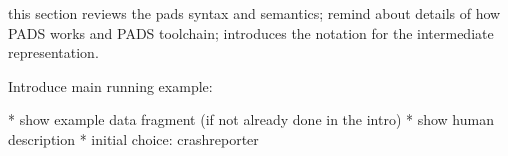 this section reviews the pads syntax and semantics; 
remind about details of how PADS works and PADS toolchain;
introduces the
notation for the intermediate representation.


Introduce main running example:  

    * show example data fragment (if not already done in the intro)
    * show human description
    * initial choice: crashreporter




